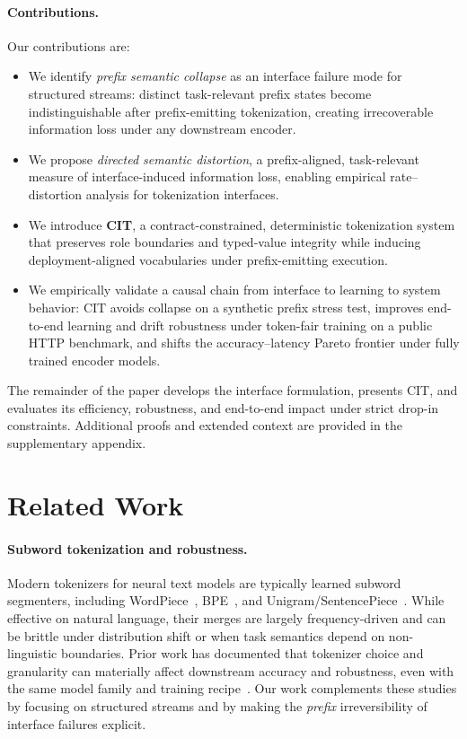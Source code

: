 \paragraph{Contributions.}
Our contributions are:

\begin{itemize}
  \item We identify \emph{prefix semantic collapse} as an interface failure mode for structured streams: distinct task-relevant prefix states become indistinguishable after prefix-emitting tokenization, creating irrecoverable information loss under any downstream encoder.
  \item We propose \emph{directed semantic distortion}, a prefix-aligned, task-relevant measure of interface-induced information loss, enabling empirical rate--distortion analysis for tokenization interfaces.
  \item We introduce \textbf{CIT}, a contract-constrained, deterministic tokenization system that preserves role boundaries and typed-value integrity while inducing deployment-aligned vocabularies under prefix-emitting execution.
  \item We empirically validate a causal chain from interface to learning to system behavior: CIT avoids collapse on a synthetic prefix stress test, improves end-to-end learning and drift robustness under token-fair training on a public HTTP benchmark, and shifts the accuracy--latency Pareto frontier under fully trained encoder models.
\end{itemize}


The remainder of the paper develops the interface formulation, presents CIT, and evaluates its efficiency, robustness, and end-to-end impact under strict drop-in constraints.
Additional proofs and extended context are provided in the supplementary appendix.

\section{Related Work}
\label{sec:related}

\paragraph{Subword tokenization and robustness.}
Modern tokenizers for neural text models are typically learned subword segmenters, including WordPiece~\cite{schuster2012japanese,wu2016gnmt}, BPE~\cite{gage1994new,sennrich2016neural}, and Unigram/SentencePiece~\cite{kudo2018subword,kudo2018sentencepiece}.
While effective on natural language, their merges are largely frequency-driven and can be brittle under distribution shift or when task semantics depend on non-linguistic boundaries.
Prior work has documented that tokenizer choice and granularity can materially affect downstream accuracy and robustness, even with the same model family and training recipe~\cite{rust2021good,mielke2021between,bostrom2020byte}.
Our work complements these studies by focusing on structured streams and by making the \emph{prefix} irreversibility of interface failures explicit.

